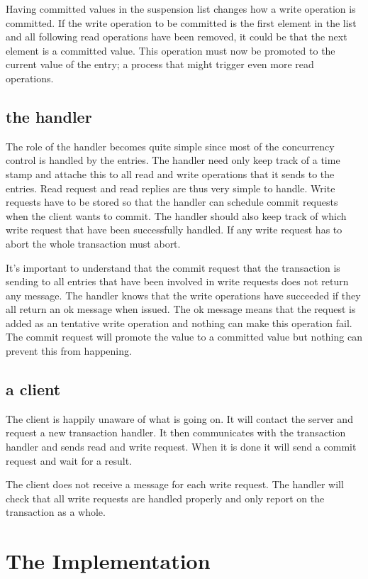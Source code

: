 \documentclass[a4paper, 11pt]{article}
\begin{document}
Having committed values in the suspension list changes how a write
operation is committed. If the write operation to be committed is the
first element in the list and all following read operations have been
removed, it could be that the next element is a committed value. This
operation must now be promoted to the current value of the entry; a
process that might trigger even more read operations. 

\subsection{the handler}

The role of the handler becomes quite simple since most of the
concurrency control is handled by the entries. The handler need only
keep track of a time stamp and attache this to all read and write
operations that it sends to the entries. Read request and read replies
are thus very simple to handle. Write requests have to be stored so
that the handler can schedule commit requests when the client wants to
commit. The handler should also keep track of which write request that
have been successfully handled. If any write request has to abort the
whole transaction must abort.

It's important to understand that the commit request that the
transaction is sending to all entries that have been involved in write
requests does not return any message. The handler knows that the write
operations have succeeded if they all return an ok message when
issued. The ok message means that the request is added as an tentative
write operation and nothing can make this operation fail. The commit
request will promote the value to a committed value but nothing can
prevent this from happening.

\subsection{a client}

The client is happily unaware of what is going on. It will contact
the server and request a new transaction handler. It then
communicates with the transaction handler and sends read and write
request. When it is done it will send a commit request and wait for a
result.

The client does not receive a message for each write request. The
handler will check that all write requests are handled properly and
only report on the transaction as a whole.


\section{The Implementation}
\end{document}
